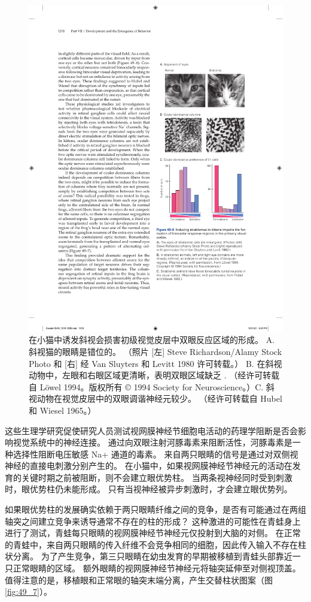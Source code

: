 \begin{figure}[htbp]
	\centering
	\includegraphics[width=0.5\linewidth]{chap49/fig_49_6}
	\caption{在小猫中诱发斜视会损害初级视觉皮层中双眼反应区域的形成。 A. 斜视猫的眼睛是错位的。 （照片 [左] Steve Richardson/Alamy Stock Photo 和 [右] 经 Van Sluyters 和 Levitt 1980 许可转载。） B. 在斜视动物中，左眼和右眼区域更清晰，表明双眼区域缺乏 . （经许可转载自 Löwel 1994。版权所有 © 1994 Society for Neuroscience。）C. 斜视动物在视觉皮层中的双眼调谐神经元较少。 （经许可转载自 Hubel 和 Wiesel 1965。）}
	\label{fig:49_6}
\end{figure}


这些生理学研究促使研究人员测试视网膜神经节细胞电活动的药理学阻断是否会影响视觉系统中的神经连接。
通过向双眼注射河豚毒素来阻断活性，河豚毒素是一种选择性阻断电压敏感 Na+ 通道的毒素。
来自两只眼睛的信号是通过对双侧视神经的直接电刺激分别产生的。
在小猫中，如果视网膜神经节神经元的活动在发育的关键时期之前被阻断，则不会建立眼优势柱。
当两条视神经同时受到刺激时，眼优势柱仍未能形成。
只有当视神经被异步刺激时，才会建立眼优势列。


如果眼优势柱的发展确实依赖于两只眼睛纤维之间的竞争，是否有可能通过在两组轴突之间建立竞争来诱导通常不存在的柱的形成？
这种激进的可能性在青蛙身上进行了测试，青蛙每只眼睛的视网膜神经节神经元仅投射到大脑的对侧。
在正常的青蛙中，来自两只眼睛的传入纤维不会竞争相同的细胞，因此传入输入不存在柱状分离。
为了产生竞争，第三只眼睛在幼虫发育的早期被移植到青蛙头部靠近一只正常眼睛的区域。
额外眼睛的视网膜神经节神经元将轴突延伸至对侧视顶盖。
值得注意的是，移植眼和正常眼的轴突末端分离，产生交替柱状图案（图 \ref{fig:49_7}）。


